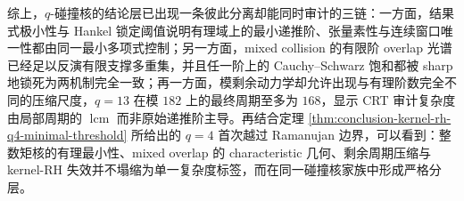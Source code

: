 







\noindent
综上，\(q\)-碰撞核的结论层已出现一条彼此分离却能同时审计的三链：一方面，结果式极小性与 Hankel 锁定阈值说明有理域上的最小递推阶、张量素性与连续窗口唯一性都由同一最小多项式控制；另一方面，mixed collision 的有限阶 overlap 光谱已经足以反演有限支撑多重集，并且任一阶上的 Cauchy--Schwarz 饱和都被 sharp 地锁死为两机制完全一致；再一方面，模剩余动力学却允许出现与有理阶数完全不同的压缩尺度，\(q=13\) 在模 \(182\) 上的最终周期至多为 \(168\)，显示 CRT 审计复杂度由局部周期的 \(\operatorname{lcm}\) 而非原始递推阶主导。再结合定理 \ref{thm:conclusion-kernel-rh-q4-minimal-threshold} 所给出的 \(q=4\) 首次越过 Ramanujan 边界，可以看到：整数矩核的有理最小性、mixed overlap 的 characteristic 几何、剩余周期压缩与 kernel-RH 失效并不塌缩为单一复杂度标签，而在同一碰撞核家族中形成严格分层。

\endinput
